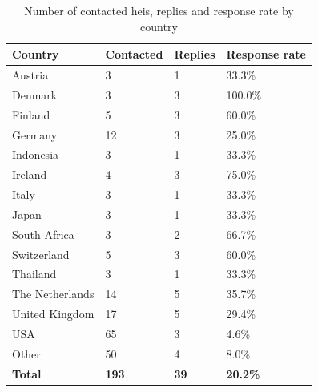 \begin{table}[]
\centering
\caption{Number of contacted \glspl{hei}, replies and response rate by country}
\label{contactedcountries}
\begin{tabular}{|l|l|l|l|}
\hline
\textbf{Country} & \textbf{Contacted} & \textbf{Replies} & \textbf{Response rate} \\ \hline
Austria          & 3                  & 1                & 33.3\%                 \\ \hline
Denmark          & 3                  & 3                & 100.0\%                \\ \hline
Finland          & 5                  & 3                & 60.0\%                 \\ \hline
Germany          & 12                 & 3                & 25.0\%                 \\ \hline
Indonesia        & 3                  & 1                & 33.3\%                 \\ \hline
Ireland          & 4                  & 3                & 75.0\%                 \\ \hline
Italy            & 3                  & 1                & 33.3\%                 \\ \hline
Japan            & 3                  & 1                & 33.3\%                 \\ \hline
South Africa     & 3                  & 2                & 66.7\%                 \\ \hline
Switzerland      & 5                  & 3                & 60.0\%                 \\ \hline
Thailand         & 3                  & 1                & 33.3\%                 \\ \hline
The Netherlands  & 14                 & 5                & 35.7\%                 \\ \hline
United Kingdom   & 17                 & 5                & 29.4\%                 \\ \hline
USA              & 65                 & 3                & 4.6\%                  \\ \hline
Other            & 50                 & 4                & 8.0\%                  \\ \hline
\textbf{Total}   & \textbf{193}       & \textbf{39}      & \textbf{20.2\%}        \\ \hline
\end{tabular}
\end{table}


